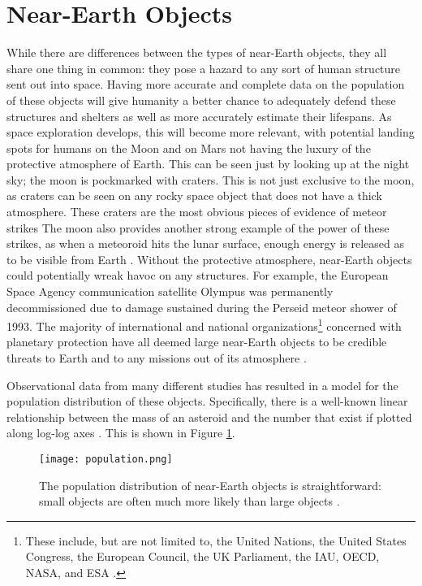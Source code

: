 \section{Near-Earth Objects}
While there are differences between the types of near-Earth objects, they all share one thing in common: they pose a hazard to any sort of human structure sent out into space. Having more accurate and complete data on the population of these objects will give humanity a better chance to adequately defend these structures and shelters as well as more accurately estimate their lifespans. As space exploration develops, this will become more relevant, with potential landing spots for humans on the Moon and on Mars not having the luxury of the protective atmosphere of Earth. This can be seen just by looking up at the night sky; the moon is pockmarked with craters. This is not just exclusive to the moon, as craters can be seen on any rocky space object that does not have a thick atmosphere. These craters are the most obvious pieces of evidence of meteor strikes The moon also provides another strong example of the power of these strikes, as when a meteoroid hits the lunar surface, enough energy is released as to be visible from Earth \cite{Rembold2015}. Without the protective atmosphere, near-Earth objects could potentially wreak havoc on any structures. For example, the European Space Agency communication satellite Olympus was permanently decommissioned due to damage sustained during the Perseid meteor shower of 1993. The majority of international and national organizations\footnote{These include, but are not limited to, the United Nations, the United States Congress, the European Council, the UK Parliament, the IAU, OECD, NASA, and ESA \cite{Bottke2007}.} concerned with planetary protection have all deemed large near-Earth objects to be credible threats to Earth and to any missions out of its atmosphere \cite{Bottke2007}.


Observational data from many different studies has resulted in a model for the population distribution of these objects. Specifically, there is a well-known linear relationship between the mass of an asteroid and the number that exist if plotted along log-log axes \cite{Rembold2015}. This is shown in Figure \ref{fig:population}.

\begin{figure}[ht!]
  \centering
  \texttt{[image: population.png]}
  \caption{The population distribution of near-Earth objects is straightforward: small objects are often much more likely than large objects \protect\cite{Rembold2015}.}
  \label{fig:population}
\end{figure}

